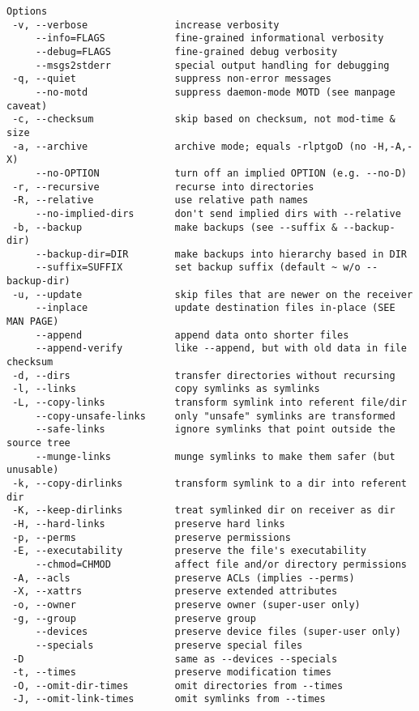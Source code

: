\begin{lstlisting}
Options
 -v, --verbose               increase verbosity
     --info=FLAGS            fine-grained informational verbosity
     --debug=FLAGS           fine-grained debug verbosity
     --msgs2stderr           special output handling for debugging
 -q, --quiet                 suppress non-error messages
     --no-motd               suppress daemon-mode MOTD (see manpage caveat)
 -c, --checksum              skip based on checksum, not mod-time & size
 -a, --archive               archive mode; equals -rlptgoD (no -H,-A,-X)
     --no-OPTION             turn off an implied OPTION (e.g. --no-D)
 -r, --recursive             recurse into directories
 -R, --relative              use relative path names
     --no-implied-dirs       don't send implied dirs with --relative
 -b, --backup                make backups (see --suffix & --backup-dir)
     --backup-dir=DIR        make backups into hierarchy based in DIR
     --suffix=SUFFIX         set backup suffix (default ~ w/o --backup-dir)
 -u, --update                skip files that are newer on the receiver
     --inplace               update destination files in-place (SEE MAN PAGE)
     --append                append data onto shorter files
     --append-verify         like --append, but with old data in file checksum
 -d, --dirs                  transfer directories without recursing
 -l, --links                 copy symlinks as symlinks
 -L, --copy-links            transform symlink into referent file/dir
     --copy-unsafe-links     only "unsafe" symlinks are transformed
     --safe-links            ignore symlinks that point outside the source tree
     --munge-links           munge symlinks to make them safer (but unusable)
 -k, --copy-dirlinks         transform symlink to a dir into referent dir
 -K, --keep-dirlinks         treat symlinked dir on receiver as dir
 -H, --hard-links            preserve hard links
 -p, --perms                 preserve permissions
 -E, --executability         preserve the file's executability
     --chmod=CHMOD           affect file and/or directory permissions
 -A, --acls                  preserve ACLs (implies --perms)
 -X, --xattrs                preserve extended attributes
 -o, --owner                 preserve owner (super-user only)
 -g, --group                 preserve group
     --devices               preserve device files (super-user only)
     --specials              preserve special files
 -D                          same as --devices --specials
 -t, --times                 preserve modification times
 -O, --omit-dir-times        omit directories from --times
 -J, --omit-link-times       omit symlinks from --times

\end{lstlisting}
